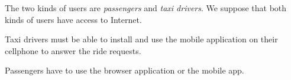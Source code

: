 The two kinds of users are \emph{passengers} and \emph{taxi drivers}.
We suppose that both kinds of users have access to Internet.

Taxi drivers must be able to install and use the mobile application on their cellphone to answer the ride requests. 

Passengers have to use the browser application or the mobile app.

